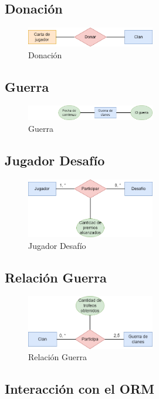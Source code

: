 \subsection{Donación}
\begin{figure}[H]
\centering
\includegraphics[width=0.5\textwidth]{../images/merx_gift.png}
\caption{Donación}
\end{figure}

\subsection{Guerra}
\begin{figure}[H]
\centering
\includegraphics[width=0.5\textwidth]{../images/merx_war.png}
\caption{Guerra}
\end{figure}

\subsection{Jugador Desafío}
\begin{figure}[H]
\centering
\includegraphics[width=0.5\textwidth]{../images/merx_playerchallenge.png}
\caption{Jugador Desafío}
\end{figure}

\subsection{Relación Guerra}
\begin{figure}[H]
\centering
\includegraphics[width=0.5\textwidth]{../images/merx_clanwar.png}
\caption{Relación Guerra}
\end{figure}

\subsection{Interacción con el ORM}

